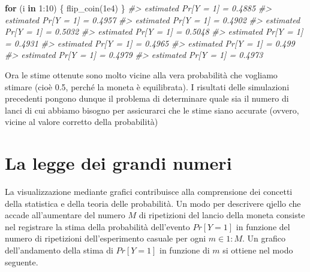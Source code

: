 \documentclass[
  11pt,
]{krantz}
\makeatletter
\newenvironment{Shaded}{\begin{snugshade}}{\end{snugshade}}
\newcommand{\CommentTok}[1]{\textcolor[rgb]{0.37,0.37,0.37}{\textit{#1}}}
\newcommand{\ControlFlowTok}[1]{\textcolor[rgb]{0.27,0.27,0.27}{\textbf{#1}}}
\newcommand{\DecValTok}[1]{\textcolor[rgb]{0.06,0.06,0.06}{#1}}
\newcommand{\FloatTok}[1]{\textcolor[rgb]{0.06,0.06,0.06}{#1}}
\newcommand{\FunctionTok}[1]{\textcolor[rgb]{0,0,0}{#1}}
\newcommand{\NormalTok}[1]{#1}
\newcommand{\SpecialCharTok}[1]{\textcolor[rgb]{0,0,0}{#1}}
\newenvironment{kframe}{%
\medskip{}
\setlength{\fboxsep}{.8em}
 \def\at@end@of@kframe{}%
 \ifinner\ifhmode%
  \def\at@end@of@kframe{\end{minipage}}%
  \begin{minipage}{\columnwidth}%
 \fi\fi%
 \def\FrameCommand##1{\hskip\@totalleftmargin \hskip-\fboxsep
 \colorbox{shadecolor}{##1}\hskip-\fboxsep
     \hskip-\linewidth \hskip-\@totalleftmargin \hskip\columnwidth}%
 \MakeFramed {\advance\hsize-\width
   \@totalleftmargin\z@ \linewidth\hsize
   \@setminipage}}%
 {\par\unskip\endMakeFramed%
 \at@end@of@kframe}
\renewenvironment{Shaded}{\begin{kframe}}{\end{kframe}}
\theoremstyle{definition}
\theoremstyle{definition}
\theoremstyle{definition}
\theoremstyle{definition}
\theoremstyle{remark}
\makeatother
\begin{document}
\begin{Shaded}
\begin{Highlighting}[]
\ControlFlowTok{for}\NormalTok{ (i }\ControlFlowTok{in} \DecValTok{1}\SpecialCharTok{:}\DecValTok{10}\NormalTok{) \{}
  \FunctionTok{flip\_coin}\NormalTok{(}\FloatTok{1e4}\NormalTok{)}
\NormalTok{\}}
\CommentTok{\#\textgreater{} estimated Pr[Y = 1] = 0.4885 }
\CommentTok{\#\textgreater{} estimated Pr[Y = 1] = 0.4957 }
\CommentTok{\#\textgreater{} estimated Pr[Y = 1] = 0.4902 }
\CommentTok{\#\textgreater{} estimated Pr[Y = 1] = 0.5032 }
\CommentTok{\#\textgreater{} estimated Pr[Y = 1] = 0.5048 }
\CommentTok{\#\textgreater{} estimated Pr[Y = 1] = 0.4931 }
\CommentTok{\#\textgreater{} estimated Pr[Y = 1] = 0.4965 }
\CommentTok{\#\textgreater{} estimated Pr[Y = 1] = 0.499 }
\CommentTok{\#\textgreater{} estimated Pr[Y = 1] = 0.4979 }
\CommentTok{\#\textgreater{} estimated Pr[Y = 1] = 0.4973}
\end{Highlighting}
\end{Shaded}

Ora le stime ottenute sono molto vicine alla vera probabilità che vogliamo stimare (cioè 0.5, perché la moneta è equilibrata). I risultati delle simulazioni precedenti pongono dunque il problema di determinare quale sia il numero di lanci di cui abbiamo bisogno per assicurarci che le stime siano accurate (ovvero, vicine al valore corretto della probabilità)

\hypertarget{la-legge-dei-grandi-numeri}{%
\section{La legge dei grandi numeri}\label{la-legge-dei-grandi-numeri}}

La visualizzazione mediante grafici contribuisce alla comprensione dei concetti della statistica e della teoria delle probabilità. Un modo per descrivere qjello che accade all'aumentare del numero \(M\) di ripetizioni del lancio della moneta consiste nel registrare la stima della probabilità dell'evento \(Pr[Y = 1]\) in funzione del numero di ripetizioni dell'esperimento casuale per ogni \(m \in 1:M.\) Un grafico dell'andamento della stima di \(Pr[Y = 1]\) in funzione di \(m\) si ottiene nel modo seguente.
\end{document}
